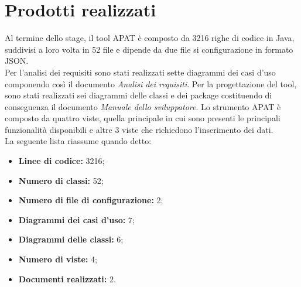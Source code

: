 
\section{Prodotti realizzati}\label{sec:prodotti-ottenuti}

Al termine dello stage, il tool APAT è composto da 3216 righe di codice in Java, suddivisi a loro volta in 52 file e dipende da due file si configurazione in formato JSON.\\
Per l'analisi dei requisiti sono stati realizzati sette diagrammi dei casi d'uso componendo così il documento \textit{Analisi dei requisiti}.
Per la progettazione del tool, sono stati realizzati sei diagrammi delle classi e dei package costituendo di conseguenza il documento \textit{Manuale dello sviluppatore}.
Lo strumento APAT è composto da quattro viste, quella principale in cui sono presenti le principali funzionalità disponibili e altre 3 viste che richiedono l'inserimento dei dati.\\
La seguente lista riassume quando detto:

\begin{itemize}
    \item \textbf{Linee di codice:} 3216;
    \item \textbf{Numero di classi:} 52;
    \item \textbf{Numero di file di configurazione:} 2;
    \item \textbf{Diagrammi dei casi d'uso:} 7;
    \item \textbf{Diagrammi delle classi:} 6;
    \item \textbf{Numero di viste:} 4;
    \item \textbf{Documenti realizzati:} 2.
\end{itemize}